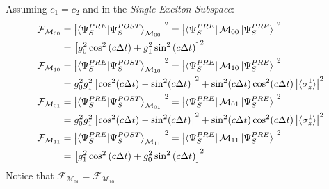 \documentclass[a4paper,12pt]{article}
\begin{document}
Assuming $ c_1 = c_2 $ and in the \textit{Single Exciton Subspace}:
\begin{align}
	\mathcal{F}_{\mathcal{M}_{00}} &= \left| \braket{\Psi_{S}^{PRE} | \Psi_{S}^{POST}}_{\mathcal{M}_{00}} \right|^2 = \left| \bra{\Psi_{S}^{PRE}}\mathcal{M}_{00} \ket{\Psi_{S}^{PRE}} \right|^2 \notag \\
	&= \left[g_0^2 \cos^2{\left(c \Delta t \right)} + g_1^2 \sin^2{\left(c \Delta t \right)}\right]^{2} \label{eq:fidelity_M00} \\
	\mathcal{F}_{\mathcal{M}_{10}} &= \left| \braket{\Psi_{S}^{PRE} | \Psi_{S}^{POST}}_{\mathcal{M}_{10}} \right|^2 = \left| \bra{\Psi_{S}^{PRE}}\mathcal{M}_{10} \ket{\Psi_{S}^{PRE}} \right|^2 \notag \\
	&= g_0^2 g_1^2 \left[ \cos^2(c \Delta t) - \sin^2(c \Delta t) \right]^2 + \sin^2(c \Delta t) \cos^2(c \Delta t) \left| \braket{\sigma_{z}^{1}} \right|^2 \label{eq:fidelity_M10} \\
	\mathcal{F}_{\mathcal{M}_{01}} &= \left| \braket{\Psi_{S}^{PRE} | \Psi_{S}^{POST}}_{\mathcal{M}_{01}} \right|^2 = \left| \bra{\Psi_{S}^{PRE}}\mathcal{M}_{01} \ket{\Psi_{S}^{PRE}} \right|^2 \notag \\
	&= g_0^2 g_1^2 \left[ \cos^2(c \Delta t) - \sin^2(c \Delta t) \right]^2 + \sin^2(c \Delta t) \cos^2(c \Delta t) \left| \braket{\sigma_{z}^{1}} \right|^2 \label{eq:fidelity_M01} \\
	\mathcal{F}_{\mathcal{M}_{11}} &= \left| \braket{\Psi_{S}^{PRE} | \Psi_{S}^{POST}}_{\mathcal{M}_{11}} \right|^2 = \left| \bra{\Psi_{S}^{PRE}}\mathcal{M}_{11} \ket{\Psi_{S}^{PRE}} \right|^2 \notag \\
	&= \left[g_1^2 \cos^2{\left(c \Delta t \right)} + g_0^2 \sin^2{\left(c \Delta t \right)} \right]^{2} \label{eq:fidelity_M11}
\end{align}
Notice that $ \mathcal{F}_{\mathcal{M}_{01}} = \mathcal{F}_{\mathcal{M}_{10}} $
\end{document}

